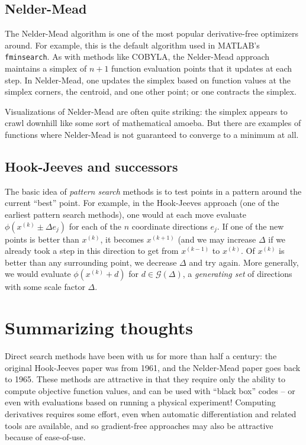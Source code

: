 \documentclass[12pt, leqno]{article} %
\begin{document}
\subsection*{Nelder-Mead}

The Nelder-Mead algorithm is one of the most popular derivative-free
optimizers around.  For example, this is the default algorithm used
in MATLAB's {\tt fminsearch}.  As with methods like COBYLA, the
Nelder-Mead approach maintains a simplex of $n+1$ function evaluation
points that it updates at each step.  In Nelder-Mead,
one updates the simplex based on function values at the simplex
corners, the centroid, and one other point; or one contracts the simplex.

Visualizations of Nelder-Mead are often quite striking: the simplex
appears to crawl downhill like some sort of mathematical amoeba.
But there are examples of functions where Nelder-Mead is not
guaranteed to converge to a minimum at all.

\subsection*{Hook-Jeeves and successors}

The basic idea of {\em pattern search} methods is to test points in a
pattern around the current ``best'' point.  For example, in the
Hook-Jeeves approach (one of the earliest pattern search methods),
one would at each move evaluate $\phi(x^{(k)} \pm \Delta e_j)$ for each
of the $n$ coordinate directions $e_j$.  If one of the new points is
better than $x^{(k)}$, it becomes $x^{(k+1)}$ (and we may increase
$\Delta$ if we already took a step in this direction to get from
$x^{(k-1)}$ to $x^{(k)}$.  Of $x^{(k)}$ is better than any surrounding
point, we decrease $\Delta$ and try again.  More generally, we would
evaluate $\phi(x^{(k)} + d)$ for $d \in \mathcal{G}(\Delta)$, a
{\em generating set} of directions with some scale factor $\Delta$.

\section*{Summarizing thoughts}

Direct search methods have been with us for more than half a century:
the original Hook-Jeeves paper was from 1961, and the Nelder-Mead
paper goes back to 1965.  These methods are attractive in that they
require only the ability to compute objective function values, and can
be used with ``black box'' codes -- or even with evaluations based on
running a physical experiment!  Computing derivatives requires some
effort, even when automatic differentiation and related tools are
available, and so gradient-free approaches may also be attractive
because of ease-of-use.
\end{document}
